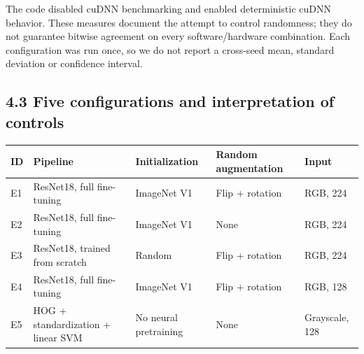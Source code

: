 \documentclass[
  10pt,
  a4paper,
]{article}
\newcounter{none} %
\begin{document}
The code disabled cuDNN benchmarking and enabled deterministic cuDNN
behavior. These measures document the attempt to control randomness;
they do not guarantee bitwise agreement on every software/hardware
combination. Each configuration was run once, so we do not report a
cross-seed mean, standard deviation or confidence interval.

\subsection{4.3 Five configurations and interpretation of
controls}\label{five-configurations-and-interpretation-of-controls}

{\def\LTcaptype{none} %
\begin{longtable}[]{@{}
  >{\raggedright\arraybackslash}p{}
  >{\raggedright\arraybackslash}p{}
  >{\raggedright\arraybackslash}p{}
  >{\raggedright\arraybackslash}p{}
  >{\raggedright\arraybackslash}p{}@{}}
\toprule\noalign{}
\begin{minipage}[b]{\linewidth}\raggedright
ID
\end{minipage} & \begin{minipage}[b]{\linewidth}\raggedright
Pipeline
\end{minipage} & \begin{minipage}[b]{\linewidth}\raggedright
Initialization
\end{minipage} & \begin{minipage}[b]{\linewidth}\raggedright
Random augmentation
\end{minipage} & \begin{minipage}[b]{\linewidth}\raggedright
Input
\end{minipage} \\
\midrule\noalign{}
\endhead
\bottomrule\noalign{}
\endlastfoot
E1 & ResNet18, full fine-tuning & ImageNet V1 & Flip + rotation & RGB,
224 \\
E2 & ResNet18, full fine-tuning & ImageNet V1 & None & RGB, 224 \\
E3 & ResNet18, trained from scratch & Random & Flip + rotation & RGB,
224 \\
E4 & ResNet18, full fine-tuning & ImageNet V1 & Flip + rotation & RGB,
128 \\
E5 & HOG + standardization + linear SVM & No neural pretraining & None &
Grayscale, 128 \\
\end{longtable}
}
\end{document}
